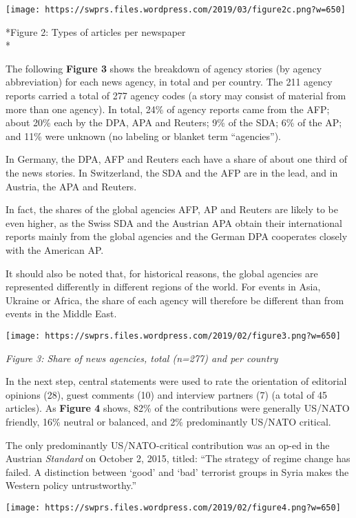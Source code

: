 \texttt{[image: https://swprs.files.wordpress.com/2019/03/figure2c.png?w=650]}

*Figure 2: Types of articles per newspaper\\
*

The following \textbf{Figure 3} shows the breakdown of agency stories
(by agency abbreviation) for each news agency, in total and per country.
The 211 agency reports carried a total of 277 agency codes (a story may
consist of material from more than one agency). In total, 24\% of agency
reports came from the AFP; about 20\% each by the DPA, APA and Reuters;
9\% of the SDA; 6\% of the AP; and 11\% were unknown (no labeling or
blanket term ``agencies'').

In Germany, the DPA, AFP and Reuters each have a share of about one
third of the news stories. In Switzerland, the SDA and the AFP are in
the lead, and in Austria, the APA and Reuters.

In fact, the shares of the global agencies AFP, AP and Reuters are
likely to be even higher, as the Swiss SDA and the Austrian APA obtain
their international reports mainly from the global agencies and the
German DPA cooperates closely with the American AP.

It should also be noted that, for historical reasons, the global
agencies are represented differently in different regions of the world.
For events in Asia, Ukraine or Africa, the share of each agency will
therefore be different than from events in the Middle East.

\texttt{[image: https://swprs.files.wordpress.com/2019/02/figure3.png?w=650]}

\emph{Figure 3: Share of news agencies, total (n=277) and per country}

In the next step, central statements were used to rate the orientation
of editorial opinions (28), guest comments (10) and interview partners
(7) (a total of 45 articles). As \textbf{Figure 4} shows, 82\% of the
contributions were generally US/NATO friendly, 16\% neutral or balanced,
and 2\% predominantly US/NATO critical.

The only predominantly US/NATO-critical contribution was an op-ed in the
Austrian \emph{Standard} on October 2, 2015, titled: ``The strategy of
regime change has failed. A distinction between `good' and `bad'
terrorist groups in Syria makes the Western policy untrustworthy.''

\texttt{[image: https://swprs.files.wordpress.com/2019/02/figure4.png?w=650]}


